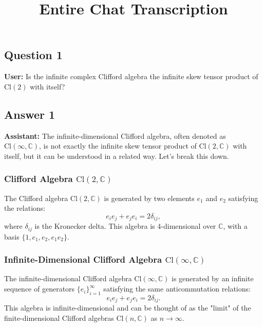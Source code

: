 \documentclass{article}
\begin{document}
\title{Entire Chat Transcription}
\author{}
\date{}
\maketitle

\subsection{Question 1}

\textbf{User:} Is the infinite complex Clifford algebra the infinite skew
tensor product of $\text{Cl}(2)$ with itself?

\subsection{Answer 1}

\textbf{Assistant:} The infinite-dimensional Clifford algebra, often denoted
as $\text{Cl}(\infty, \mathbb{C})$, is not exactly the infinite skew tensor
product of $\text{Cl}(2, \mathbb{C})$ with itself, but it can be understood
in a related way. Let's break this down.

\subsubsection{Clifford Algebra $\text{Cl}(2, \mathbb{C})$}

The Clifford algebra $\text{Cl}(2, \mathbb{C})$ is generated by two elements 
$e_1$ and $e_2$ satisfying the relations: 
\begin{equation*}
e_i e_j + e_j e_i = 2 \delta_{ij}, 
\end{equation*}
where $\delta_{ij}$ is the Kronecker delta. This algebra is 4-dimensional
over $\mathbb{C}$, with a basis $\{1, e_1, e_2, e_1 e_2\}$.

\subsubsection{Infinite-Dimensional Clifford Algebra $\text{Cl}(\infty, 
\mathbb{C})$}

The infinite-dimensional Clifford algebra $\text{Cl}(\infty, \mathbb{C})$ is
generated by an infinite sequence of generators $\{e_i\}_{i=1}^\infty$
satisfying the same anticommutation relations: 
\begin{equation*}
e_i e_j + e_j e_i = 2 \delta_{ij}. 
\end{equation*}
This algebra is infinite-dimensional and can be thought of as the "limit" of
the finite-dimensional Clifford algebras $\text{Cl}(n, \mathbb{C})$ as $n
\to \infty$.
\end{document}
